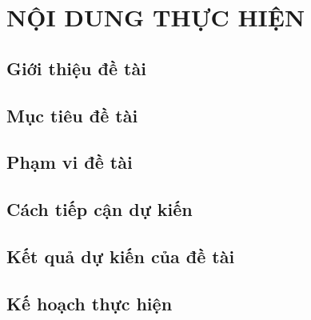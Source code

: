 \newpage

\section{NỘI DUNG THỰC HIỆN}

\subsection{Giới thiệu đề tài}

\subsection{Mục tiêu đề tài}

\subsection{Phạm vi đề tài}

\subsection{Cách tiếp cận dự kiến}

\subsection{Kết quả dự kiến của đề tài}

\subsection{Kế hoạch thực hiện}